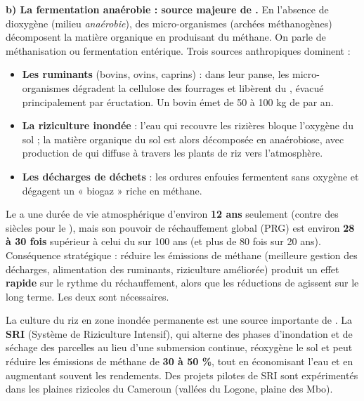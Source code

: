 \documentclass[11pt]{article}
\newcommand{\cle}[1]{{\popxbold\color{popdark}#1}}
\begin{document}
\textbf{b) La fermentation anaérobie : source majeure de .} En l'absence de dioxygène (milieu \emph{anaérobie}), des micro-organismes (archées méthanogènes) décomposent la matière organique en produisant du méthane. On parle de \cle{méthanisation} ou fermentation entérique. Trois sources anthropiques dominent :
\begin{itemize}
\item \textbf{Les ruminants} (bovins, ovins, caprins) : dans leur panse, les micro-organismes dégradent la cellulose des fourrages et libèrent du , évacué principalement par éructation. Un bovin émet de 50 à 100 kg de  par an.
\item \textbf{La riziculture inondée} : l'eau qui recouvre les rizières bloque l'oxygène du sol ; la matière organique du sol est alors décomposée en anaérobiose, avec production de  qui diffuse à travers les plants de riz vers l'atmosphère.
\item \textbf{Les décharges de déchets} : les ordures enfouies fermentent sans oxygène et dégagent un « biogaz » riche en méthane.
\end{itemize}

\begin{attention}
Le  a une durée de vie atmosphérique d'environ \textbf{12 ans} seulement (contre des siècles pour le ), mais son \cle{pouvoir de réchauffement global} (PRG) est environ \textbf{28 à 30 fois} supérieur à celui du  sur 100 ans (et plus de 80 fois sur 20 ans). Conséquence stratégique : réduire les émissions de méthane (meilleure gestion des décharges, alimentation des ruminants, riziculture améliorée) produit un effet \textbf{rapide} sur le rythme du réchauffement, alors que les réductions de  agissent sur le long terme. Les deux sont nécessaires.
\end{attention}

\begin{savaistu}
La culture du riz en zone inondée permanente est une source importante de . La \textbf{SRI} (Système de Riziculture Intensif), qui alterne des phases d'inondation et de séchage des parcelles au lieu d'une submersion continue, réoxygène le sol et peut réduire les émissions de méthane de \textbf{30 à 50 \%}, tout en économisant l'eau et en augmentant souvent les rendements. Des projets pilotes de SRI sont expérimentés dans les plaines rizicoles du Cameroun (vallées du Logone, plaine des Mbo).
\end{savaistu}
\end{document}
